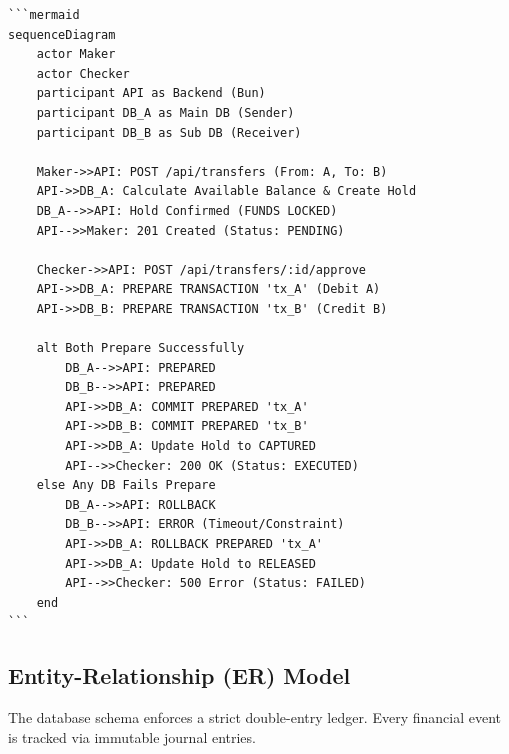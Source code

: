 \begin{center}
\begin{verbatim}
```mermaid
sequenceDiagram
    actor Maker
    actor Checker
    participant API as Backend (Bun)
    participant DB_A as Main DB (Sender)
    participant DB_B as Sub DB (Receiver)

    Maker->>API: POST /api/transfers (From: A, To: B)
    API->>DB_A: Calculate Available Balance & Create Hold
    DB_A-->>API: Hold Confirmed (FUNDS LOCKED)
    API-->>Maker: 201 Created (Status: PENDING)

    Checker->>API: POST /api/transfers/:id/approve
    API->>DB_A: PREPARE TRANSACTION 'tx_A' (Debit A)
    API->>DB_B: PREPARE TRANSACTION 'tx_B' (Credit B)
    
    alt Both Prepare Successfully
        DB_A-->>API: PREPARED
        DB_B-->>API: PREPARED
        API->>DB_A: COMMIT PREPARED 'tx_A'
        API->>DB_B: COMMIT PREPARED 'tx_B'
        API->>DB_A: Update Hold to CAPTURED
        API-->>Checker: 200 OK (Status: EXECUTED)
    else Any DB Fails Prepare
        DB_A-->>API: ROLLBACK
        DB_B-->>API: ERROR (Timeout/Constraint)
        API->>DB_A: ROLLBACK PREPARED 'tx_A'
        API->>DB_A: Update Hold to RELEASED
        API-->>Checker: 500 Error (Status: FAILED)
    end
```
\end{verbatim}
\end{center}

\subsection{Entity-Relationship (ER) Model}

The database schema enforces a strict double-entry ledger. Every financial event is tracked via immutable journal entries.

